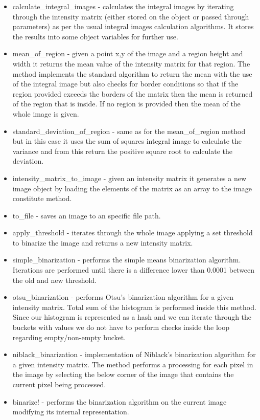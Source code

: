 \documentclass[a4paper,10pt,titlepage]{article}
\begin{document}
\begin{description}
\begin{itemize}
		\item calculate\_integral\_images - calculates the integral images by iterating through the intensity matrix (either stored on the object or passed through parameters) as per the usual integral images calculation algorithms. It stores the results into some object variables for further use.
		\item mean\_of\_region - given a point x,y of the image and a region height and width it returns the mean value of the intensity matrix for that region. The method implements the standard algorithm to return the mean with the use of the integral image but also checks for border conditions so that if the region provided exceeds the borders of the matrix then the mean is returned of the region that is inside. If no region is provided then the mean of the whole image is given. 
		\item standard\_deviation\_of\_region - same as for the mean\_of\_region method but in this case it uses the sum of squares integral image to calculate the variance and from this return the positive square root to calculate the deviation. 
		\item intensity\_matrix\_to\_image - given an intensity matrix it generates a new image object by loading the elements of the matrix as an array to the image constitute method.
		\item to\_file - saves an image to an specific file path.
		\item apply\_threshold - iterates through the whole image applying a set threshold to binarize the image and returns a new intensity matrix. 
		\item simple\_binarization - performs the simple means binarization algorithm. Iterations are performed until there is a difference lower than 0.0001 between the old and new threshold.
		\item otsu\_binarization - performs Otsu's binarization algorithm for a given intensity matrix. Total sum of the histogram is performed inside this method. Since our histogram is represented as a hash and we can iterate through the buckets with values we do not have to perform checks inside the loop regarding empty/non-empty bucket. 
		\item niblack\_binarization - implementation of Niblack's binarization algorithm for a given intensity matrix. The method performs a processing for each pixel in the image by selecting the below corner of the image that contains the current pixel being processed. 
		\item binarize! - performs the binarization algorithm on the current image modifying its internal representation. 

\end{itemize}
\end{description}
\end{document}
